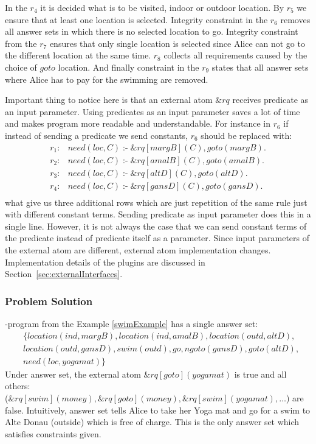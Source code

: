 \documentclass[14pt,a4paper, titlepage]{article}
\newcommand{\ext}[3]{\ensuremath{\&{#1}[#2](#3)}}
\DeclareMathOperator{\leftimpl}{:-}
\begin{document}
In the $r_4$ it is decided what is to be visited, indoor or 
outdoor location. By $r_5$ we ensure that at least one location is selected. Integrity constraint 
in the $r_6$ removes all answer sets in which there is no selected location to go. Integrity constraint from the $r_7$ ensures that only single location is selected since Alice can not go to the different location at the same time. $r_8$ collects all requirements caused by 
the choice of $\mathit{goto}$ location. And finally 
constraint in the $r_9$ states that all answer sets where 
Alice has to pay for the swimming are removed.

Important thing to notice here is that an external atom 
$\mathit{\&rq}$ receives predicate as an input parameter. 
Using predicates as an input parameter saves a lot of time 
and makes program more readable and understandable. For 
instance in $r_6$ if instead of sending a predicate we send 
constants, $r_6$ should be replaced with:
\begin{align*}
r_1\colon& need(loc, C) \leftimpl \ext{rq}{margB}{C}, 
goto(margB).\\
r_2\colon& need(loc, C) \leftimpl \ext{rq}{amalB}{C}, 
goto(amalB).\\
r_3\colon& need(loc, C) \leftimpl \ext{rq}{altD}{C}, 
goto(altD).\\
r_4\colon& need(loc, C) \leftimpl \ext{rq}{gansD}{C}, 
goto(gansD).\\
\end{align*}    
what give us three additional rows which are just 
repetition of the same rule just with different constant 
terms. Sending predicate as input parameter does this in a 
single line. However, it is not always the case that we can send constant terms of the predicate instead of predicate itself  as a parameter. Since input parameters of the external atom are different, external atom implementation changes. Implementation details of the plugins are discussed in Section~\ref{sec:externalInterfaces}.

\subsubsection{Problem Solution}
\hex{}-program from the Example \ref{swimExample} has a 
single answer set:
\begin{align*}
& \{ 
location(ind,margB),location(ind,amalB),location(outd,altD), 
\\
& location(outd,gansD), 
swim(outd),go,ngoto(gansD),goto(altD),\\
& need(loc,yogamat) \} 
\end{align*}
Under answer set, the external atom $\ext{rq}{goto}
{yogamat}$ is true and all others:\\($\ext{rq}{swim}
{money}, \ext{rq}{goto}{money}, \ext{rq}{swim}{yogamat}, 
\dots $) are false. Intuitively, answer set tells Alice to 
take her Yoga mat and go for a swim to Alte Donau (outside) 
which is free of charge. This is the only answer set which 
satisfies constraints given.    
\end{document}
